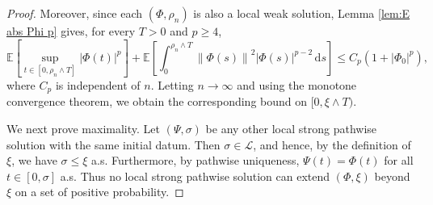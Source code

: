 \documentclass[11pt, reqno]{amsart}
\theoremstyle{definition}
\numberwithin{equation}{section}
\newcommand{\norm}[1]{\left\|{#1}\right\|}
\begin{document}
\begin{proof}
	Moreover, since each $(\Phi,\rho_n)$ is also a local weak solution, Lemma
	\ref{lem:E abs Phi p} gives, for every $T>0$ and $p\geq4$,
	\[
	\mathbb E\left[
	\sup_{t\in[0,\rho_n\wedge T]}|\Phi(t)|^p
	\right]
	+
	\mathbb E\left[
	\int_0^{\rho_n\wedge T}
	\norm{\Phi(s)}^2 |\Phi(s)|^{p-2}\,\mathrm ds
	\right]
	\leq
	C_p(1+|\Phi_0|^p),
	\]
	where $C_p$ is independent of $n$. Letting $n\to\infty$ and using the
	monotone convergence theorem, we obtain the corresponding bound on
	$[0,\xi\wedge T)$.
	
	We next prove maximality. Let $(\Psi,\sigma)$ be any other local strong
	pathwise solution with the same initial datum. Then $\sigma\in\mathcal L$,
	and hence, by the definition of $\xi$, we have $\sigma\leq \xi$ a.s.
	Furthermore, by pathwise uniqueness, $\Psi(t)=\Phi(t)$ for all $t\in [0,\sigma]$ a.s.
	Thus no local strong pathwise solution can extend $(\Phi,\xi)$ beyond
	$\xi$ on a set of positive probability.
	

\end{proof}
\end{document}
